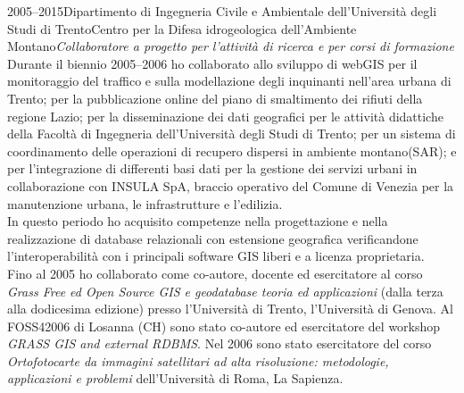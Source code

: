 \documentclass{curriculum}
\begin{document}
    \begin{entrylist}
    \entry
        {2005--2015}{Dipartimento di Ingegneria Civile e Ambientale dell'Università degli Studi di Trento}{Centro per la Difesa idrogeologica dell'Ambiente Montano}{\emph{Collaboratore a progetto per l'attività di ricerca e per corsi di formazione}\hfill\vspace{3pt}\\
        Durante il biennio 2005--2006 ho collaborato allo sviluppo di webGIS per il monitoraggio del traffico e sulla modellazione degli inquinanti nell'area urbana di Trento; per la pubblicazione online del piano di smaltimento dei rifiuti della regione Lazio; per la disseminazione dei dati geografici per le attività didattiche della Facoltà di Ingegneria dell'Università degli Studi di Trento; per un sistema di coordinamento delle operazioni di recupero dispersi in ambiente montano(SAR); e per l'integrazione di differenti basi dati per la gestione dei servizi urbani in collaborazione con INSULA SpA, braccio operativo del Comune di Venezia per la manutenzione urbana, le infrastrutture e l'edilizia.
        \\In questo periodo ho acquisito competenze nella progettazione e nella realizzazione di database relazionali con estensione geografica verificandone l'interoperabilità con i principali software GIS liberi e a licenza proprietaria.
        \\Fino al 2005 ho collaborato come co-autore, docente ed esercitatore al corso \textit{Grass Free ed Open Source GIS e geodatabase teoria ed applicazioni} (dalla terza alla dodicesima edizione) presso l'Università di Trento, l'Università di Genova. Al FOSS42006 di Losanna (CH) sono stato co-autore ed esercitatore del workshop \textit{GRASS GIS and external RDBMS}. 
        Nel 2006 sono stato esercitatore del corso \textit{Ortofotocarte da immagini satellitari ad alta risoluzione: metodologie, applicazioni e problemi} dell'Università di Roma, La Sapienza.}
    \end{entrylist}
    
\end{document}
